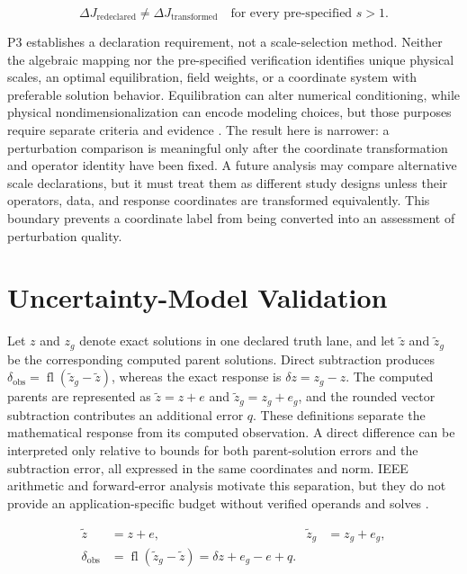 \documentclass[preprint,12pt]{elsarticle}
\begin{document}
\begin{linenomath*}
\begin{equation}
\Delta J_{\mathrm{redeclared}}\neq
\Delta J_{\mathrm{transformed}}\quad\text{for every pre-specified }s>1.
\label{eq:p3_redeclaration_result}
\end{equation}
\end{linenomath*}

P3 establishes a declaration requirement, not a scale-selection method. Neither the algebraic mapping nor the pre-specified verification identifies unique physical scales, an optimal equilibration, field weights, or a coordinate system with preferable solution behavior. Equilibration can alter numerical conditioning, while physical nondimensionalization can encode modeling choices, but those purposes require separate criteria and evidence \cite{S07,S08}. The result here is narrower: a perturbation comparison is meaningful only after the coordinate transformation and operator identity have been fixed. A future analysis may compare alternative scale declarations, but it must treat them as different study designs unless their operators, data, and response coordinates are transformed equivalently. This boundary prevents a coordinate label from being converted into an assessment of perturbation quality.

\FloatBarrier
\section{Uncertainty-Model Validation}
\label{sec:uncertainty}

Let $z$ and $z_g$ denote exact solutions in one declared truth lane, and let $\widetilde z$ and $\widetilde z_g$ be the corresponding computed parent solutions. Direct subtraction produces $\delta_{\mathrm{obs}} = \operatorname{fl}(\widetilde z_g-\widetilde z)$, whereas the exact response is $\delta z=z_g-z$. The computed parents are represented as $\widetilde z=z+e$ and $\widetilde z_g=z_g+e_g$, and the rounded vector subtraction contributes an additional error $q$. These definitions separate the mathematical response from its computed observation. A direct difference can be interpreted only relative to bounds for both parent-solution errors and the subtraction error, all expressed in the same coordinates and norm. IEEE arithmetic and forward-error analysis motivate this separation, but they do not provide an application-specific budget without verified operands and solves \cite{S09,S10,S11}.

\begin{linenomath*}
\begin{equation}
\begin{aligned}
\widetilde z &= z+e, & \widetilde z_g &= z_g+e_g,\\
\delta_{\mathrm{obs}}&=\operatorname{fl}(\widetilde z_g-\widetilde z)
=\delta z+e_g-e+q.
\end{aligned}
\label{eq:computed_difference_model}
\end{equation}
\end{linenomath*}
\end{document}
